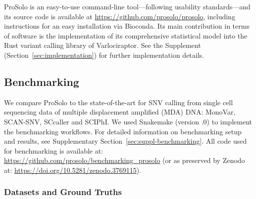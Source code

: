 \documentclass[12pt,inline]{wlscirep}
\begin{document}
ProSolo is an easy-to-use command-line tool---following usability standards\cite{taschuk_ten_2017}---and its source code is available at \url{https://github.com/prosolo/prosolo}, including instructions for an easy installation via Bioconda\cite{gruning_bioconda:_2018}.
Its main contribution in terms of software is the implementation of its comprehensive statistical model into the Rust variant calling library of Varlociraptor\cite{koster_varlociraptor_2020}.
See the Supplement (Section~\ref{sec:implementation}) for further implementation details.

\subsection*{Benchmarking}

We compare ProSolo to the state-of-the-art for SNV calling from single cell sequencing data of multiple displacement amplified (MDA) DNA: MonoVar\cite{zafar_monovar:_2016}, SCAN-SNV\cite{luquette_identification_2019}, SCcaller\cite{dong_accurate_2017} and SCIPhI\cite{singer_single-cell_2018}. We used Snakemake\cite{koster_snakemakescalable_2012} (version {.0}) to implement the benchmarking workflows.
For detailed information on benchmarking setup and results, see Supplementary Section~\ref{sec:suppl-benchmarking}.
All code used for benchmarking is available at: \url{https://github.com/prosolo/benchmarking_prosolo} (or as preserved by Zenodo at: \url{https://doi.org/10.5281/zenodo.3769115}).

\subsubsection*{Datasets and Ground Truths}
\end{document}
